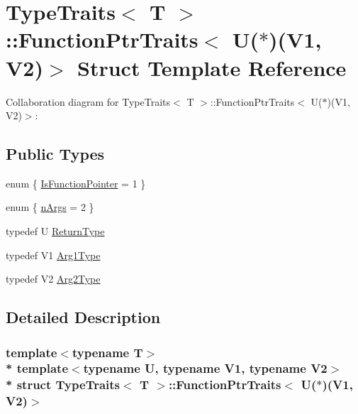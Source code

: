 \hypertarget{structTypeTraits_1_1FunctionPtrTraits_3_01U_07_5_08_07V1_00_01V2_08_4}{}\section{Type\+Traits$<$ T $>$\+:\+:Function\+Ptr\+Traits$<$ U($\ast$)(V1, V2)$>$ Struct Template Reference}
\label{structTypeTraits_1_1FunctionPtrTraits_3_01U_07_5_08_07V1_00_01V2_08_4}


Collaboration diagram for Type\+Traits$<$ T $>$\+:\+:Function\+Ptr\+Traits$<$ U($\ast$)(V1, V2)$>$\+:
\subsection*{Public Types}
\begin{DoxyCompactItemize}
\item 
enum \{ \hyperlink{structTypeTraits_1_1FunctionPtrTraits_3_01U_07_5_08_07V1_00_01V2_08_4_a7174898c28b3492c5115774a13e19211a044f925811737913e50ed579c4ea0163}{Is\+Function\+Pointer} = 1
 \}
\item 
enum \{ \hyperlink{structTypeTraits_1_1FunctionPtrTraits_3_01U_07_5_08_07V1_00_01V2_08_4_a1b0f7a4a6b43cd1ed0dc19694d246e9caef3c1f024ce240558cceffc98834aaa2}{n\+Args} = 2
 \}
\item 
typedef U \hyperlink{structTypeTraits_1_1FunctionPtrTraits_3_01U_07_5_08_07V1_00_01V2_08_4_a48f1a676f3f7cb5f5e4c2d2a5050784e}{Return\+Type}
\item 
typedef V1 \hyperlink{structTypeTraits_1_1FunctionPtrTraits_3_01U_07_5_08_07V1_00_01V2_08_4_a928b76d110f8abcf9d1374aa9cbfea23}{Arg1\+Type}
\item 
typedef V2 \hyperlink{structTypeTraits_1_1FunctionPtrTraits_3_01U_07_5_08_07V1_00_01V2_08_4_a7b0cf45deee3970a093f931e0d0c3b36}{Arg2\+Type}
\end{DoxyCompactItemize}


\subsection{Detailed Description}
\subsubsection*{template$<$typename T$>$\\*
template$<$typename U, typename V1, typename V2$>$\\*
struct Type\+Traits$<$ T $>$\+::\+Function\+Ptr\+Traits$<$ U($\ast$)(\+V1, V2)$>$}

